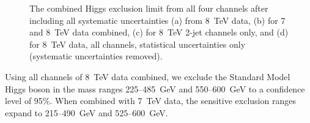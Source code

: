 \begin{figure}[htb]
\begin{center}
{    }
    \caption{The combined Higgs exclusion limit from all four channels
      after including all systematic uncertainties (a) from 8~TeV
      data, (b) for 7 and 8~TeV data combined, (c) for 8~TeV 2-jet
      channels only, and (d) for 8~TeV data, all channels, statistical
      uncertainties only (systematic uncertainties removed).}
    \label{fig:limitsetup:combinedlimit}
  \end{center}
\end{figure}

Using all channels of 8~TeV data combined, we
exclude the Standard Model Higgs boson in the mass ranges
225--485~GeV and 550--600~GeV
to a confidence level of 95\%. 
When combined with 7~TeV data, the sensitive exclusion ranges expand to
215--490~GeV and 525--600~GeV.

